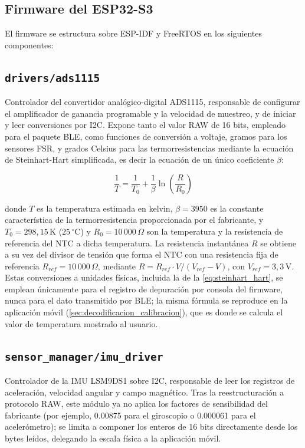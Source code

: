 \begin{IAtext}
\section{Firmware del ESP32-S3}

El firmware se estructura sobre ESP-IDF y FreeRTOS en los siguientes componentes:

\subsection{\texttt{drivers/ads1115}}
Controlador del convertidor analógico-digital ADS1115, responsable de configurar el amplificador de ganancia programable y la velocidad de muestreo, y de iniciar y leer conversiones por I2C. Expone tanto el valor RAW de 16 bits, empleado para el paquete BLE, como funciones de conversión a voltaje, gramos para los sensores FSR, y grados Celsius para las termorresistencias mediante la ecuación de Steinhart-Hart simplificada, es decir la ecuación de un único coeficiente $\beta$:

\begin{equation}
\frac{1}{T} = \frac{1}{T_0} + \frac{1}{\beta}\ln\!\left(\frac{R}{R_0}\right)
\label{eq:steinhart_hart}
\end{equation}

donde $T$ es la temperatura estimada en kelvin, $\beta = 3950$ es la constante característica de la termorresistencia proporcionada por el fabricante, y $T_0 = 298{,}15\,\text{K}$ ($25\,^\circ\text{C}$) y $R_0 = 10\,000\,\Omega$ son la temperatura y la resistencia de referencia del NTC a dicha temperatura. La resistencia instantánea $R$ se obtiene a su vez del divisor de tensión que forma el NTC con una resistencia fija de referencia $R_{ref} = 10\,000\,\Omega$, mediante $R = R_{ref} \cdot V / (V_{ref} - V)$, con $V_{ref} = 3{,}3\,\text{V}$. Estas conversiones a unidades físicas, incluida la de la \cref{eq:steinhart_hart}, se emplean únicamente para el registro de depuración por consola del firmware, nunca para el dato transmitido por BLE; la misma fórmula se reproduce en la aplicación móvil (\cref{sec:decodificacion_calibracion}), que es donde se calcula el valor de temperatura mostrado al usuario.

\subsection{\texttt{sensor\_manager/imu\_driver}}
Controlador de la IMU LSM9DS1 sobre I2C, responsable de leer los registros de aceleración, velocidad angular y campo magnético. Tras la reestructuración a protocolo RAW, este módulo ya no aplica los factores de sensibilidad del fabricante (por ejemplo, 0.00875 para el giroscopio o 0.000061 para el acelerómetro); se limita a componer los enteros de 16 bits directamente desde los bytes leídos, delegando la escala física a la aplicación móvil.


\end{IAtext}
